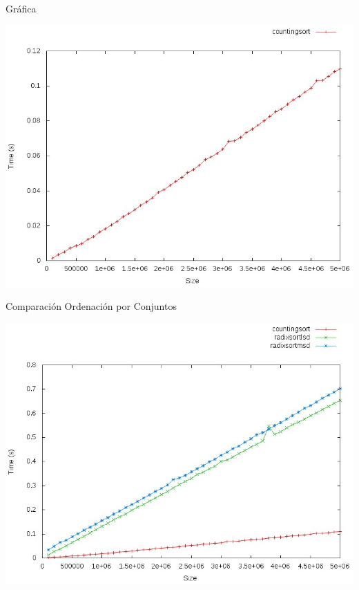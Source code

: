 \documentclass[compress]{beamer}
\begin{document}
\begin{frame}{Gráfica}
	\begin{alertblock}{}
		\begin{center}
		\includegraphics[scale=0.40]{images/countingsort.jpeg}
		\end{center}
	\end{alertblock}
\end{frame}

\begin{frame}{Comparación Ordenación por Conjuntos}
	\begin{alertblock}{}
		\begin{center}
		\includegraphics[scale=0.40]{images/coun-radi-radi.jpeg}
		\end{center}
	\end{alertblock}
\end{frame}
\end{document}
